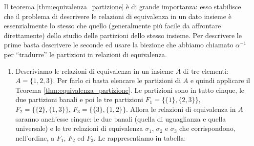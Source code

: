 Il teorema \ref{thm:equivalenza_partizione} è di grande importanza: esso stabilisce che il problema di descrivere le relazioni di equivalenza in
un dato insieme è essenzialmente lo stesso che quello (generalmente più facile da affrontare direttamente) dello studio delle partizioni dello stesso insieme. Per descrivere le prime basta descrivere le seconde ed usare la biezione che abbiamo chiamato $\alpha^{-1}$ per ``tradurre'' le partizioni in relazioni di equivalenza.
\begin{example}
	\begin{enumerate}
		\item Descriviamo le relazioni di equivalenza in un insieme $A$ di tre elementi: $A= \{1,2,3\}$. Per farlo ci basta elencare le partizioni di $A$ e quindi applicare il Teorema \ref{thm:equivalenza_partizione}. Le partizioni sono in tutto cinque, le due partizioni banali e poi le tre partizioni $F_{1}=\{\{1\},\{2,3\}\}$, $F_{2}=\{\{2\},\{1,3\}\}$, $F_{3}=\{\{3\},\{1,2\}\}$. Allora le relazioni di equivalenza in $A$ saranno anch'esse cinque: le due banali (quella di uguaglianza e quella universale) e le tre relazioni di equivalenza $\sigma_{1}$, $\sigma_{2}$ e $\sigma_{3}$ che corrispondono, nell'ordine, a $F_{1}$, $F_{2}$ ed $F_{3}$. Le rappresentiamo in tabella:
	\medskip
	

\end{enumerate}
\end{example}
